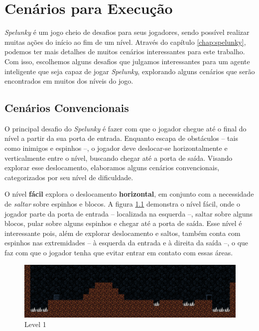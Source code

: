 \chapter{\label{chap:scenarios}Cenários para Execução}

\textit{Spelunky} é um jogo cheio de desafios para seus jogadores, sendo
possível realizar muitas ações do início ao fim de um nível. Através do
capítulo \ref{chap:spelunky}, podemos ter mais detalhes de muitos cenários
interessantes para este trabalho. Com isso, escolhemos alguns desafios que
julgamos interessantes para um agente inteligente que seja capaz de jogar
\textit{Spelunky}, explorando alguns cenários que serão encontrados em muitos
dos níveis do jogo.

\section{Cenários Convencionais}

O principal desafio do \textit{Spelunky} é fazer com que o jogador chegue até
o final do nível a partir da sua porta de entrada. Enquanto escapa de
obstáculos -- tais como inimigos e espinhos --, o jogador deve deslocar-se
horizontalmente e verticalmente entre o nível, buscando chegar até a porta de
saída. Visando explorar esse deslocamento, elaboramos alguns cenários
convencionais, categorizados por seu nível de dificuldade.

O nível \textbf{fácil} explora o deslocamento \textbf{horizontal}, em conjunto
com a necessidade de \textit{saltar} sobre espinhos e blocos. A figura
\ref{fig:level1} demonstra o nível fácil, onde o jogador parte da porta de
entrada -- localizada na esquerda --, saltar sobre alguns blocos, pular sobre
alguns espinhos e chegar até a porta de saída. Esse nível é interessante pois,
além de explorar deslocamento e saltos, também conta com espinhos nas
extremidades -- à esquerda da entrada e à direita da saída --, o que faz com
que o jogador tenha que evitar entrar em contato com essas áreas.

\begin{figure}[H]
\centering
\includegraphics[width=\textwidth]{fig/levels/level1.pdf}
\caption{Level 1}
\label{fig:level1}
\end{figure}

